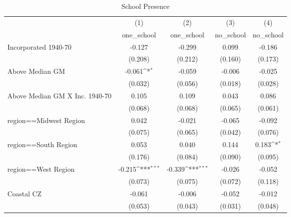 \begin{table}[htbp]\centering
\def\sym#1{\ifmmode^{#1}\else\(^{#1}\)\fi}
\caption{School Presence}
\begin{tabular}{l*{4}{c}}
\hline\hline
                    &\multicolumn{1}{c}{(1)}&\multicolumn{1}{c}{(2)}&\multicolumn{1}{c}{(3)}&\multicolumn{1}{c}{(4)}\\
                    &\multicolumn{1}{c}{one\_school}&\multicolumn{1}{c}{one\_school}&\multicolumn{1}{c}{no\_school}&\multicolumn{1}{c}{no\_school}\\
\hline
Incorporated 1940-70&      -0.127         &      -0.299         &       0.099         &      -0.186         \\
                    &     (0.208)         &     (0.212)         &     (0.160)         &     (0.173)         \\
[1em]
Above Median GM     &      -0.061\sym{*}  &      -0.059         &      -0.006         &      -0.025         \\
                    &     (0.032)         &     (0.056)         &     (0.018)         &     (0.028)         \\
[1em]
Above Median GM X Inc. 1940-70&       0.105         &       0.109         &       0.043         &       0.086         \\
                    &     (0.068)         &     (0.068)         &     (0.065)         &     (0.061)         \\
[1em]
region==Midwest Region&       0.042         &      -0.021         &      -0.065         &      -0.092         \\
                    &     (0.075)         &     (0.065)         &     (0.042)         &     (0.076)         \\
[1em]
region==South Region&       0.053         &       0.040         &       0.144         &       0.183\sym{*}  \\
                    &     (0.176)         &     (0.084)         &     (0.090)         &     (0.095)         \\
[1em]
region==West Region &      -0.215\sym{***}&      -0.339\sym{***}&      -0.026         &      -0.052         \\
                    &     (0.073)         &     (0.075)         &     (0.072)         &     (0.118)         \\
[1em]
Coastal CZ          &      -0.061         &      -0.006         &      -0.052         &      -0.012         \\
                    &     (0.053)         &     (0.043)         &     (0.031)         &     (0.048)         \\

\end{tabular}
\end{table}
